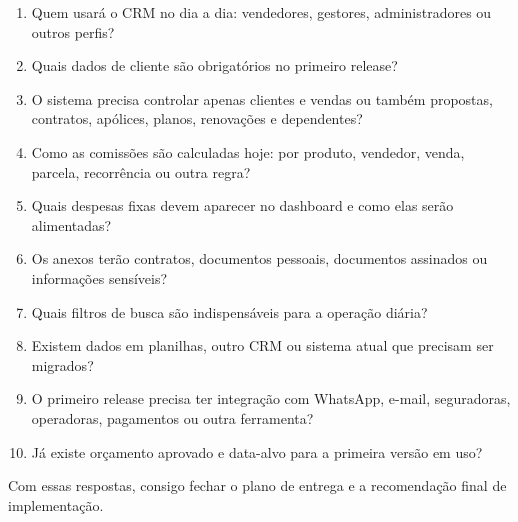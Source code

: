 \documentclass[11pt,a4paper]{article}
\begin{document}
\begin{enumerate}
\item Quem usará o CRM no dia a dia: vendedores, gestores, administradores ou outros perfis?
\item Quais dados de cliente são obrigatórios no primeiro release?
\item O sistema precisa controlar apenas clientes e vendas ou também propostas, contratos, apólices, planos, renovações e dependentes?
\item Como as comissões são calculadas hoje: por produto, vendedor, venda, parcela, recorrência ou outra regra?
\item Quais despesas fixas devem aparecer no dashboard e como elas serão alimentadas?
\item Os anexos terão contratos, documentos pessoais, documentos assinados ou informações sensíveis?
\item Quais filtros de busca são indispensáveis para a operação diária?
\item Existem dados em planilhas, outro CRM ou sistema atual que precisam ser migrados?
\item O primeiro release precisa ter integração com WhatsApp, e-mail, seguradoras, operadoras, pagamentos ou outra ferramenta?
\item Já existe orçamento aprovado e data-alvo para a primeira versão em uso?
\end{enumerate}

Com essas respostas, consigo fechar o plano de entrega e a recomendação final de implementação.\par
\end{document}
